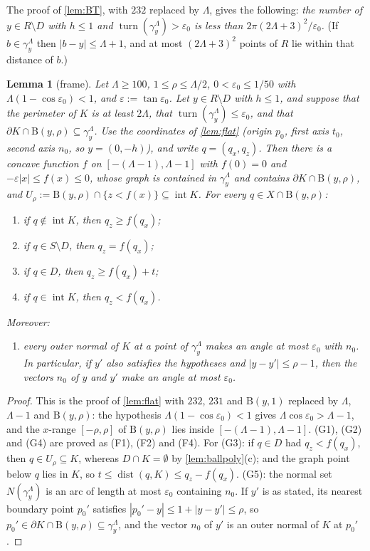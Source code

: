\documentclass[11pt]{amsart}
\newtheorem{lemma}[theorem]{Lemma}
\theoremstyle{definition}
\theoremstyle{remark}
\newcommand{\eps}{\varepsilon}
\newcommand{\turn}{\operatorname{turn}}
\newcommand{\dist}{\operatorname{dist}}
\newcommand{\Dd}{\mathrm{B}}      %
\begin{document}
The proof of \cref{lem:BT}, with $232$ replaced by $\Lambda$, gives the following: \emph{the number of $y\in R\setminus D$ with $h\le1$ and $\turn(\gamma_y^\Lambda)>\eps_0$ is less than $2\pi(2\Lambda+3)^2/\eps_0$.} (If $b\in\gamma^\Lambda_y$ then $|b-y|\le\Lambda+1$, and at most $(2\Lambda+3)^2$ points of $R$ lie within that distance of $b$.)

\begin{lemma}[frame]\label{lem:frame}
Let $\Lambda\ge100$, $1\le\rho\le\Lambda/2$, $0<\eps_0\le1/50$ with $\Lambda(1-\cos\eps_0)<1$, and $\eps:=\tan\eps_0$. Let $y\in R\setminus D$ with $h\le1$, and suppose that the perimeter of $K$ is at least $2\Lambda$, that $\turn(\gamma^\Lambda_y)\le\eps_0$, and that $\partial K\cap\Dd(y,\rho)\subseteq\gamma^\Lambda_y$. Use the coordinates of \cref{lem:flat} (origin $p_0$, first axis $t_0$, second axis $n_0$, so $y=(0,-h)$), and write $q=(q_x,q_z)$. Then there is a concave function $f$ on $[-(\Lambda-1),\Lambda-1]$ with $f(0)=0$ and $-\eps|x|\le f(x)\le0$, whose graph is contained in $\gamma^\Lambda_y$ and contains $\partial K\cap\Dd(y,\rho)$, and $U_\rho:=\Dd(y,\rho)\cap\{z<f(x)\}\subseteq\operatorname{int}K$. For every $q\in X\cap\Dd(y,\rho)$:
\begin{enumerate}[label=\textup{(G\arabic*)},leftmargin=3em]
\item if $q\notin\operatorname{int}K$, then $q_z\ge f(q_x)$;
\item if $q\in S\setminus D$, then $q_z=f(q_x)$;
\item if $q\in D$, then $q_z\ge f(q_x)+t$;
\item if $q\in\operatorname{int}K$, then $q_z<f(q_x)$.
\end{enumerate}
Moreover:
\begin{enumerate}[label=\textup{(G\arabic*)},leftmargin=3em,resume]
\item every outer normal of $K$ at a point of $\gamma^\Lambda_y$ makes an angle at most $\eps_0$ with $n_0$. In particular, if $y'$ also satisfies the hypotheses and $|y-y'|\le\rho-1$, then the vectors $n_0$ of $y$ and $y'$ make an angle at most $\eps_0$.
\end{enumerate}
\end{lemma}
\begin{proof}
This is the proof of \cref{lem:flat} with $232$, $231$ and $\Dd(y,1)$ replaced by $\Lambda$, $\Lambda-1$ and $\Dd(y,\rho)$: the hypothesis $\Lambda(1-\cos\eps_0)<1$ gives $\Lambda\cos\eps_0>\Lambda-1$, and the $x$-range $[-\rho,\rho]$ of $\Dd(y,\rho)$ lies inside $[-(\Lambda-1),\Lambda-1]$. (G1), (G2) and (G4) are proved as (F1), (F2) and (F4). For (G3): if $q\in D$ had $q_z<f(q_x)$, then $q\in U_\rho\subseteq K$, whereas $D\cap K=\emptyset$ by \cref{lem:ballpoly}(c); and the graph point below $q$ lies in $K$, so $t\le\dist(q,K)\le q_z-f(q_x)$. (G5): the normal set $N(\gamma^\Lambda_y)$ is an arc of length at most $\eps_0$ containing $n_0$. If $y'$ is as stated, its nearest boundary point $p_0'$ satisfies $|p_0'-y|\le1+|y-y'|\le\rho$, so $p_0'\in\partial K\cap\Dd(y,\rho)\subseteq\gamma^\Lambda_y$, and the vector $n_0$ of $y'$ is an outer normal of $K$ at $p_0'$.
\end{proof}
\end{document}
